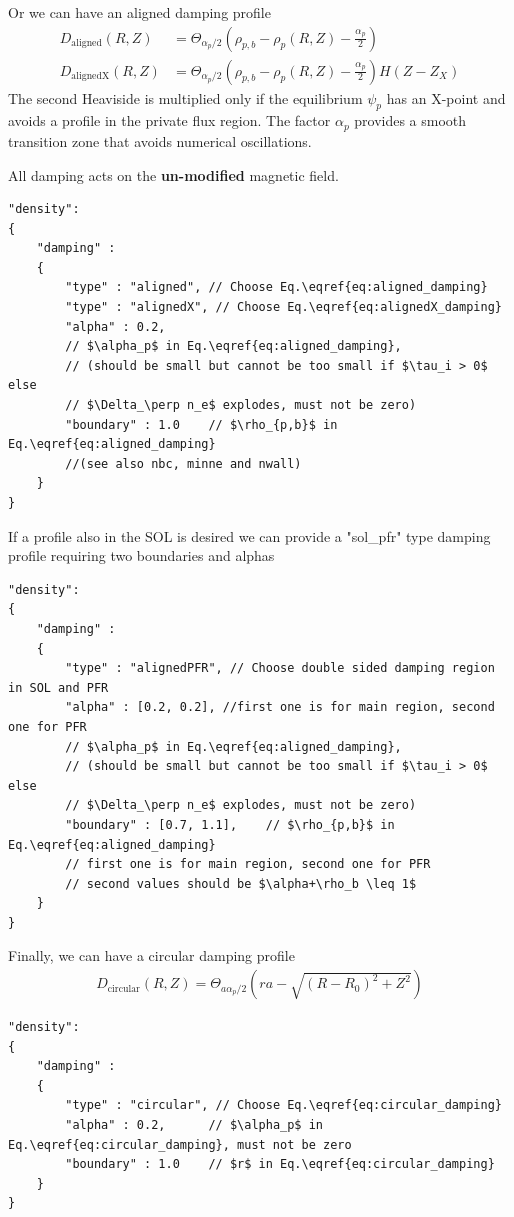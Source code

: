 Or we can have an aligned damping profile
\begin{align}
    \label{eq:aligned_damping}
    D_\mathrm{aligned}(R,Z)&=\Theta_{\alpha_p/2}\left(\rho_{p,b}-\rho_p(R, Z)-\frac{\alpha_p}{2}\right)\\
    \label{eq:alignedX_damping}
    D_\mathrm{alignedX}(R,Z)&=\Theta_{\alpha_p/2}\left(\rho_{p,b}-\rho_p(R, Z)-\frac{\alpha_p}{2}\right) H(Z-Z_X)
\end{align}
The second Heaviside is multiplied only if the equilibrium $\psi_p$ has an
X-point and avoids a profile in the private flux region.
The factor $\alpha_p$ provides a smooth transition
zone that avoids numerical oscillations.
\begin{tcolorbox}[title=Note]
    All damping acts on the \textbf{un-modified} magnetic field.
\end{tcolorbox}
\begin{verbatim}
"density":
{
    "damping" :
    {
        "type" : "aligned", // Choose Eq.\eqref{eq:aligned_damping}
        "type" : "alignedX", // Choose Eq.\eqref{eq:alignedX_damping}
        "alpha" : 0.2,
        // $\alpha_p$ in Eq.\eqref{eq:aligned_damping},
        // (should be small but cannot be too small if $\tau_i > 0$ else
        // $\Delta_\perp n_e$ explodes, must not be zero)
        "boundary" : 1.0    // $\rho_{p,b}$ in Eq.\eqref{eq:aligned_damping}
        //(see also nbc, minne and nwall)
    }
}
\end{verbatim}
If a profile also in the SOL is desired we can provide a "sol\_pfr" type damping
profile requiring two boundaries and alphas
\begin{verbatim}
"density":
{
    "damping" :
    {
        "type" : "alignedPFR", // Choose double sided damping region in SOL and PFR
        "alpha" : [0.2, 0.2], //first one is for main region, second one for PFR
        // $\alpha_p$ in Eq.\eqref{eq:aligned_damping},
        // (should be small but cannot be too small if $\tau_i > 0$ else
        // $\Delta_\perp n_e$ explodes, must not be zero)
        "boundary" : [0.7, 1.1],    // $\rho_{p,b}$ in Eq.\eqref{eq:aligned_damping}
        // first one is for main region, second one for PFR
        // second values should be $\alpha+\rho_b \leq 1$
    }
}
\end{verbatim}
Finally, we can have a circular damping profile
\begin{align} \label{eq:circular_damping}
    D_\mathrm{circular}(R,Z) = \Theta_{ a \alpha_p/2}\left( r a- \sqrt{(R-R_0)^2 + Z^2}\right)
\end{align}
\begin{verbatim}
"density":
{
    "damping" :
    {
        "type" : "circular", // Choose Eq.\eqref{eq:circular_damping}
        "alpha" : 0.2,      // $\alpha_p$ in Eq.\eqref{eq:circular_damping}, must not be zero
        "boundary" : 1.0    // $r$ in Eq.\eqref{eq:circular_damping}
    }
}
\end{verbatim}

